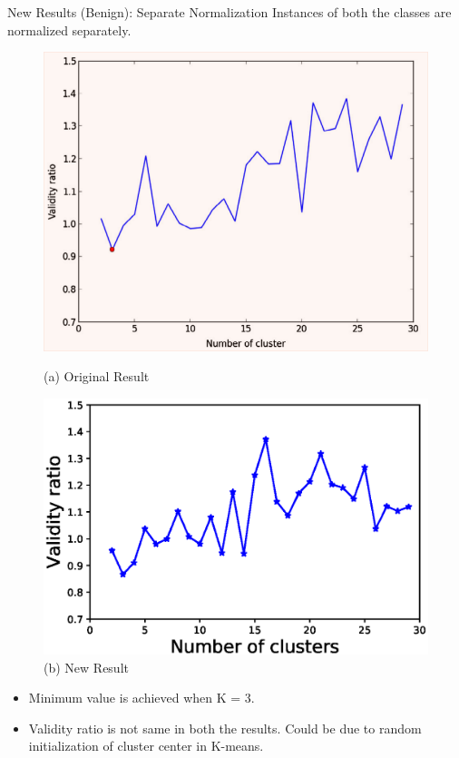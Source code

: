 \documentclass[xcolor=dvipsnames]{beamer}
\begin{document}
\begin{frame}{New Results (Benign): Separate Normalization}
Instances of both the classes are normalized separately.
\begin{figure}[H]
\begin{minipage}[t]{0.5\linewidth}
    \includegraphics[scale=0.2]{Figures/BenignOriginal}
    \caption*{(a) Original Result}
\end{minipage}%
\begin{minipage}[t]{0.5\linewidth}
    \includegraphics[scale=0.43]{Figures/Benign_VR_K_New.eps}
    \caption*{(b) New Result}
\end{minipage} 
\end{figure} 

\begin{block}{}
\begin{itemize}
\item Minimum value is achieved when K = 3.
\item Validity ratio is not same in both the results. Could be due to random initialization of cluster center in K-means.
\end{itemize} 
\end{block}
\end{frame}
\end{document}
